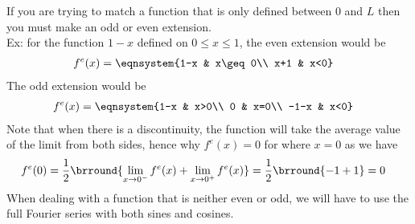 If you are trying to match a function that is only defined between $0$ and $L$ then you must make an odd or even extension.\\
Ex: for the function $1-x$ defined on $0\leq x\leq1$, the even extension would be
\begin{align*}
    &f^e(x)=\eqnsystem{1-x & x\geq 0\\ x+1 & x<0}
\end{align*}
The odd extension would be
\begin{align*}
    &f^e(x)=\eqnsystem{1-x & x>0\\ 0 & x=0\\ -1-x & x<0}
\end{align*}
Note that when there is a discontinuity, the function will take the average value of the limit from both sides, hence why $f^e(x)=0$ for where $x=0$ as we have
\begin{align*}
    &f^e(0)=\frac{1}{2}\brround{\lim_{x\to 0^-}f^e(x)+\lim_{x\to0^+}f^e(x)}=\frac{1}{2}\brround{-1+1}=0
\end{align*}
When dealing with a function that is neither even or odd, we will have to use the full Fourier series with both sines and cosines.

